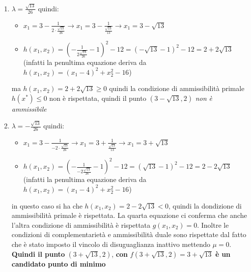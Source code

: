 \documentclass[a4paper,12pt, oneside]{book}
\begin{document}
\begin{enumerate}
  \item $\lambda = \frac{\sqrt{13}}{26}$ quindi:
  \begin{itemize}
    \item $x_1=3-\frac{1}{2\cdot \frac{\sqrt{13}}{26}}\to
    x_1=3-\frac{1}{\frac{\sqrt{13}}{13}}\to x_1=3-\sqrt{13}$
    \item
    $h(x_1,x_2)=(-\frac{1}{2\frac{\sqrt{13}}{26}}-1)^2-12=(-\sqrt{13}-1)^2-12=
    2+2\sqrt{13}$ \\(infatti la penultima equazione deriva da
    $h(x_1,x_2)=(x_1-4)^2+x_2^2-16$) 
  \end{itemize}
  ma $h(x_1,x_2)=2+2\sqrt{13}\geq 0$ quindi la condizione di
  ammissibilità primale $h(x^*)\leq 0$ non è rispettata, quindi il
  punto $(3-\sqrt{13},2)$ \textit{non è ammissibile}
  
  \item $\lambda = -\frac{\sqrt{13}}{26}$ quindi:
  \begin{itemize}
    \item $x_1=3-\frac{1}{-2\cdot \frac{\sqrt{13}}{26}}\to
    x_1=3+\frac{1}{\frac{\sqrt{13}}{13}}\to x_1=3+\sqrt{13}$
    \item
    $h(x_1,x_2)=(-\frac{1}{-2\frac{\sqrt{13}}{26}}-1)^2-12=(\sqrt{13}-1)^2-12=
    2-2\sqrt{13}$ \\(infatti la penultima equazione deriva da
    $h(x_1,x_2)=(x_1-4)^2+x_2^2-16$) 
  \end{itemize}
  in questo caso si ha che $h(x_1,x_2)=2-2\sqrt{13}< 0$, quindi la
  dondizione di ammissibilità primale è rispettata. La quarta
  equazione ci conferma che anche l'altra condizione di ammissibilità
  è rispettata $g(x_1,x_2)=0$. Inoltre le condizioni di
  complementarietà e ammissibilità duale sono rispettate dal fatto che
  è stato imposto il vincolo di disuguaglianza inattivo mettendo
  $\mu=0$. \\
 \textbf{ Quindi il punto} $(3+\sqrt{13},2)$,\textbf{ con}
  $f(3+\sqrt{13},2)=3+\sqrt{13}$\textbf{ è un }\textbf{candidato punto di
    minimo} 
\end{enumerate}
\end{document}
